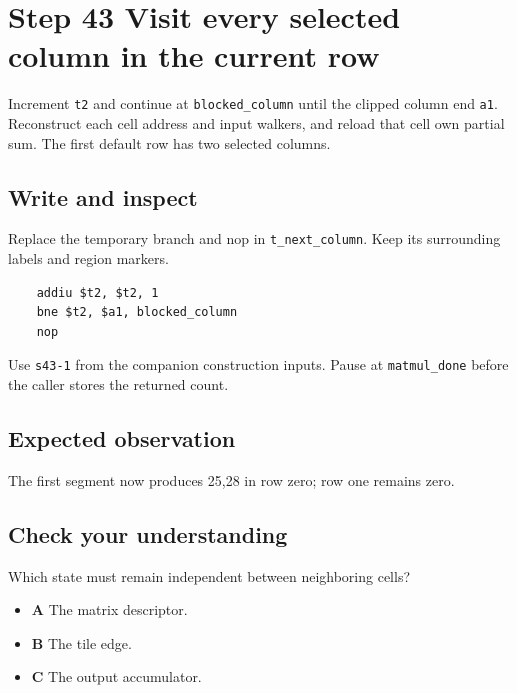 \section{Step 43 Visit every selected column in the current row}\label{matmul-s43}

Increment \texttt{t2} and continue at \texttt{blocked\_column} until the clipped column end \texttt{a1}. Reconstruct each cell address and input walkers, and reload that cell own partial sum. The first default row has two selected columns.

\subsection{Write and inspect}
Replace the temporary branch and nop in \texttt{t\_next\_column}. Keep its surrounding labels and region markers.

\begin{verbatim}
    addiu $t2, $t2, 1
    bne $t2, $a1, blocked_column
    nop
\end{verbatim}
Use \texttt{s43-1} from the companion construction inputs. Pause at \texttt{matmul\_done} before the caller stores the returned count.

\subsection{Expected observation}
The first segment now produces 25,28 in row zero; row one remains zero.

\subsection{Check your understanding}
Which state must remain independent between neighboring cells?

\begin{itemize}
  \item \textbf{A} The matrix descriptor.
  \item \textbf{B} The tile edge.
  \item \textbf{C} The output accumulator.
\end{itemize}

